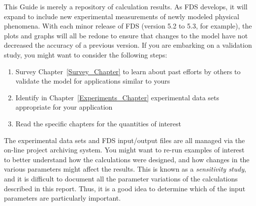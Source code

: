 This Guide is merely a repository of calculation results. As FDS develops, it will expand to include new experimental measurements of newly modeled
physical phenomena. With each minor release of FDS (version 5.2 to 5.3, for example), the plots and graphs will all be redone to ensure that changes to
the model have not decreased the accuracy of a previous version. If you are embarking on a validation study, you might want to consider the following steps:
\begin{enumerate}
\item Survey Chapter~\ref{Survey_Chapter} to learn about past efforts by others to validate the model for applications similar to yours
\item Identify in Chapter~\ref{Experiments_Chapter} experimental data sets appropriate for your application
\item Read the specific chapters for the quantities of interest
\end{enumerate}
The experimental data sets and FDS input/output files are all managed via the on-line project archiving system. You might want to re-run examples of interest
to better understand how the calculations were designed, and how changes in the various parameters might affect the results. This is known as a {\em sensitivity study},
and it is difficult to document all the parameter variations of the calculations described in this report. Thus, it is a good idea to determine which of the input
parameters are particularly important.
